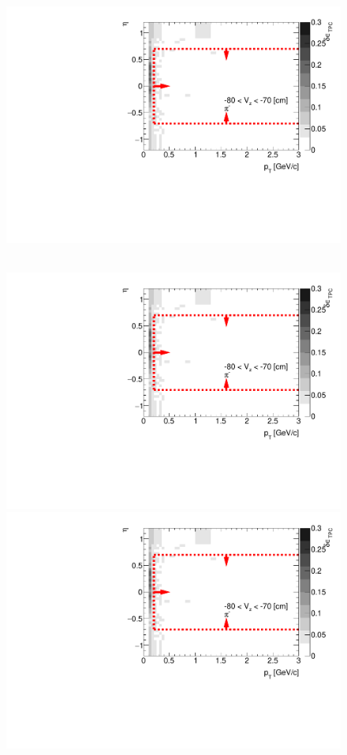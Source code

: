\begin{figure}[hb]
{  \includegraphics[width=\linewidth,page=15]{graphics/systematicsEfficiency/deadMaterial/secondaries_Unbinned_CD_.pdf}\\
}~
\parbox{0.495\textwidth}{
  \centering
  \includegraphics[width=\linewidth,page=10]{graphics/systematicsEfficiency/deadMaterial/secondaries_Unbinned_CD_.pdf}\\
  \includegraphics[width=\linewidth,page=12]{graphics/systematicsEfficiency/deadMaterial/secondaries_Unbinned_CD_.pdf}\\
}
\end{figure}
